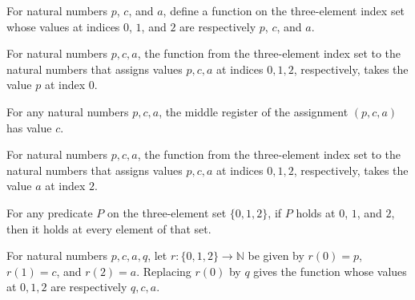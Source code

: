 \begin{definition}
\label{BoolCircuit.AdjScan.rg}
\leanok
For natural numbers $p$, $c$, and $a$, define a function on the three-element index set
whose values at indices $0$, $1$, and $2$ are respectively $p$, $c$, and $a$.
\end{definition}

\begin{lemma}
\label{BoolCircuit.AdjScan.rg_zero}
\leanok
{}
For natural numbers $p,c,a$, the function from the three-element index set to the
natural numbers that assigns values $p,c,a$ at indices $0,1,2$, respectively, takes the
value $p$ at index $0$.
\end{lemma}

\begin{lemma}
\label{BoolCircuit.AdjScan.rg_one}
\leanok
{}
For any natural numbers $p,c,a$, the middle register of the assignment $(p,c,a)$ has
value $c$.
\end{lemma}

\begin{lemma}
\label{BoolCircuit.AdjScan.rg_two}
\leanok
{}
For natural numbers $p,c,a$, the function from the three-element index set to the
natural numbers that assigns values $p,c,a$ at indices $0,1,2$, respectively, takes the
value $a$ at index $2$.
\end{lemma}

\begin{lemma}
\label{BoolCircuit.AdjScan.fin3_cases}
\leanok
{}
For any predicate $P$ on the three-element set $\{0,1,2\}$, if $P$ holds at $0$, $1$,
and $2$, then it holds at every element of that set.
\end{lemma}

\begin{lemma}
\label{BoolCircuit.AdjScan.upd_zero}
\leanok
{}
For natural numbers $p,c,a,q$, let $r:\{0,1,2\}\to\mathbb{N}$ be given by $r(0)=p$,
$r(1)=c$, and $r(2)=a$. Replacing $r(0)$ by $q$ gives the function whose values at
$0,1,2$ are respectively $q,c,a$.
\end{lemma}

